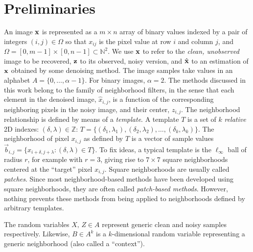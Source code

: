 \documentclass{article}
\begin{document}
\section{Preliminaries}
An image $\vx$ is represented as a $m{\times}n$ array of binary values indexed by a pair of integers $(i,j) \in \Omega$ so that $x_{ij}$ is the pixel value at row $i$ and column $j$, and $\Omega = [0,m-1]\times[0,n-1] \subset \mathbb{N}^2$. We use $\vx$ to refer to the \emph{clean, unobserved} image to be recovered, $\vz$ to its observed, noisy version, and $\hvx$ to an estimation of $\vx$ obtained by some denoising method. The image samples take values in an alphabet $A=\{0,\ldots,\alpha-1\}$. For binary images, $\alpha=2$.
\def\hx{\hat{x}}
\def\vb{\vec{b}}
The methods discussed in this work belong to the family of neighborhood filters, in the sense that each element in the denoised image, $\hx_{i,j}$, is a function of the corresponding neighboring pixels in the noisy image, and their center, $z_{i,j}$. The neighborhood relationship is defined by means of a \emph{template}. A template $T$ is a set of $k$ \emph{relative} 2D indexes: $(\delta,\lambda) \in \mathbb{Z}$: $T=\{(\delta_1,\lambda_1),(\delta_2,\lambda_2),\ldots,(\delta_k,\lambda_k)\}$. The neighborhood of  pixel $x_{i,j}$ as defined by $T$ is a vector of sample values $\vb_{i,j}=\{x_{i+\delta,j+\lambda}: (\delta,\lambda) \in T\}.$ To fix ideas, a typical template is the $\ell_\infty$ ball of radius $r$, for example with $r=3$, giving rise to $7{\times}7$ square neighborhoods centered at the ``target'' pixel $x_{i,j}$.
Square neighborhoods are usually called \emph{patches}. Since most neighborhood-based methods have been developed using square neighborhoods, they are often called \emph{patch-based methods}. However, nothing prevents these methods from being applied to  neighborhoods defined by arbitrary templates.

The random variables $X,\,Z \in A$ represent generic clean and noisy samples respectively. Likewise, $B \in A^k$ is a $k$-dimensional random variable representing a generic neighborhood (also called a ``context''). 

\end{document}
